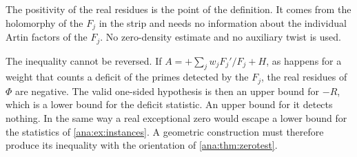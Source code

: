 The positivity of the real residues is the point of the definition. It comes from the
holomorphy of the $F_j$ in the strip and needs no information about the individual Artin
factors of the $F_j$. No zero-density estimate and no auxiliary twist is used.

\begin{remark}[Orientation]\label{ana:rem:sign}
The inequality cannot be reversed. If $A=+\sum_jw_jF_j'/F_j+H$, as happens for a weight that
counts a deficit of the primes detected by the $F_j$, the real residues of $\Phi$ are negative.
The valid one-sided hypothesis is then an upper bound for $-R$, which is a lower bound for the
deficit statistic. An upper bound for it detects nothing. In the same way a real exceptional
zero would escape a lower bound for the statistics of \cref{ana:ex:instances}. A geometric
construction must therefore produce its inequality with the orientation of
\cref{ana:thm:zerotest}.
\end{remark}

